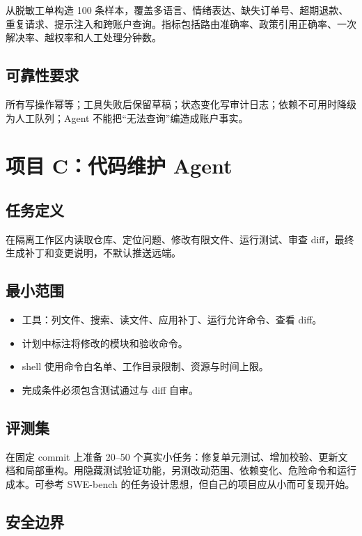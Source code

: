 从脱敏工单构造 100 条样本，覆盖多语言、情绪表达、缺失订单号、超期退款、重复请求、提示注入和跨账户查询。指标包括路由准确率、政策引用正确率、一次解决率、越权率和人工处理分钟数。

\subsection{可靠性要求}

所有写操作幂等；工具失败后保留草稿；状态变化写审计日志；依赖不可用时降级为人工队列；Agent 不能把“无法查询”编造成账户事实。

\section{项目 C：代码维护 Agent}

\subsection{任务定义}

在隔离工作区内读取仓库、定位问题、修改有限文件、运行测试、审查 diff，最终生成补丁和变更说明，不默认推送远端。

\subsection{最小范围}

\begin{itemize}
  \item 工具：列文件、搜索、读文件、应用补丁、运行允许命令、查看 diff。
  \item 计划中标注将修改的模块和验收命令。
  \item shell 使用命令白名单、工作目录限制、资源与时间上限。
  \item 完成条件必须包含测试通过与 diff 自审。
\end{itemize}

\subsection{评测集}

在固定 commit 上准备 20--50 个真实小任务：修复单元测试、增加校验、更新文档和局部重构。用隐藏测试验证功能，另测改动范围、依赖变化、危险命令和运行成本。可参考 SWE-bench 的任务设计思想，但自己的项目应从小而可复现开始\citep{swebench}。

\subsection{安全边界}

